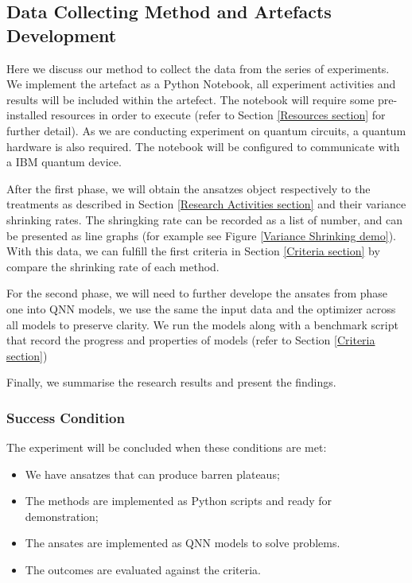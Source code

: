 \subsection{Data Collecting Method and Artefacts Development}
\label{Data Collecting Section}
Here we discuss our method to collect the data from the series of experiments.
We implement the artefact as a Python Notebook, all experiment activities and results will be included within the artefect.
The notebook will require some pre-installed resources in order to execute (refer to Section \ref{Resources section} for further detail).
As we are conducting experiment on quantum circuits, a quantum hardware is also required.
The notebook will be configured to communicate with a IBM quantum device.

After the first phase, we will obtain the ansatzes object respectively to the treatments as described in Section \ref{Research Activities section} and their variance shrinking rates.
The shringking rate can be recorded as a list of number, and can be presented as line graphs (for example see Figure \ref{Variance Shrinking demo}).
With this data, we can fulfill the first criteria in Section \ref{Criteria section} by compare the shrinking rate of each method.

For the second phase, we will need to further develope the ansates from phase one into QNN models, we use the same the input data and the optimizer across all models to preserve clarity.
We run the models along with a benchmark script that record the progress and properties of models (refer to Section \ref{Criteria section})

Finally, we summarise the research results and present the findings.

\subsubsection{Success Condition}
The experiment will be concluded when these conditions are met:
\begin{itemize}
    \item We have ansatzes that can produce barren plateaus;
    \item The methods are implemented as Python scripts and ready for demonstration;
    \item The ansates are implemented as QNN models to solve problems.
    \item The outcomes are evaluated against the criteria.
\end{itemize}